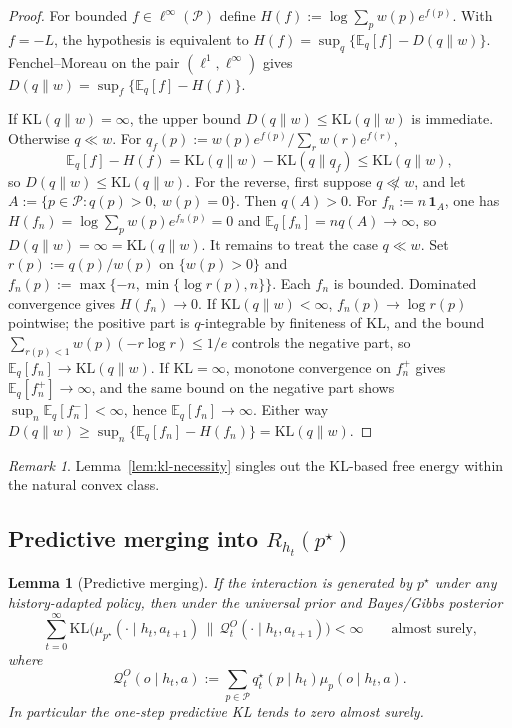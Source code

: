 \documentclass[11pt]{article}
\newtheorem{lemma}[theorem]{Lemma}
\theoremstyle{definition}
\theoremstyle{remark}
\newtheorem{remark}[theorem]{Remark}
\newcommand{\Pcal}{\mathcal{P}}
\newcommand{\Qcal}{\mathcal{Q}}
\newcommand{\E}{\mathbb{E}}
\newcommand{\KL}{\mathrm{KL}}
\newcommand{\one}{\mathbf{1}}
\begin{document}
\begin{proof}
For bounded $f\in\ell^\infty(\Pcal)$ define $H(f):=\log\sum_p w(p)e^{f(p)}$. With $f=-L$, the hypothesis is equivalent to $H(f)=\sup_q\{\E_q[f]-D(q\|w)\}$. Fenchel--Moreau on the pair $(\ell^1,\ell^\infty)$ gives $D(q\|w)=\sup_f\{\E_q[f]-H(f)\}$.

If $\KL(q\|w)=\infty$, the upper bound $D(q\|w)\le \KL(q\|w)$ is immediate. Otherwise $q\ll w$. For $q_f(p):=w(p)e^{f(p)}/\sum_r w(r)e^{f(r)}$,
\[
\E_q[f]-H(f)=\KL(q\|w)-\KL(q\|q_f)\le \KL(q\|w),
\]
so $D(q\|w)\le\KL(q\|w)$. For the reverse, first suppose $q\not\ll w$, and let $A:=\{p\in\Pcal:q(p)>0,\ w(p)=0\}$. Then $q(A)>0$. For $f_n:=n\,\one_A$, one has $H(f_n)=\log\sum_p w(p)e^{f_n(p)}=0$ and $\E_q[f_n]=nq(A)\to\infty$, so $D(q\|w)=\infty=\KL(q\|w)$. It remains to treat the case $q\ll w$. Set $r(p):=q(p)/w(p)$ on $\{w(p)>0\}$ and $f_n(p):=\max\{-n,\min\{\log r(p),n\}\}$. Each $f_n$ is bounded. Dominated convergence gives $H(f_n)\to 0$. If $\KL(q\|w)<\infty$, $f_n(p)\to\log r(p)$ pointwise; the positive part is $q$-integrable by finiteness of $\KL$, and the bound $\sum_{r(p)<1}w(p)(-r\log r)\le 1/e$ controls the negative part, so $\E_q[f_n]\to\KL(q\|w)$. If $\KL=\infty$, monotone convergence on $f_n^+$ gives $\E_q[f_n^+]\to\infty$, and the same bound on the negative part shows $\sup_n\E_q[f_n^-]<\infty$, hence $\E_q[f_n]\to\infty$. Either way $D(q\|w)\ge\sup_n\{\E_q[f_n]-H(f_n)\}=\KL(q\|w)$.
\end{proof}

\begin{remark}
Lemma~\ref{lem:kl-necessity} singles out the KL-based free energy within the natural convex class.
\end{remark}

\subsection{Predictive merging into $R_{h_t}(p^\star)$}

\begin{lemma}[Predictive merging]
\label{lem:merging}
If the interaction is generated by $p^\star$ under any history-adapted policy, then under the universal prior and Bayes/Gibbs posterior
\[
\sum_{t=0}^{\infty}
\KL\!\bigl(\mu_{p^\star}(\cdot\mid h_t,a_{t+1})\,\|\,\Qcal_t^O(\cdot\mid h_t,a_{t+1})\bigr)
<\infty
\qquad
\text{almost surely,}
\]
where
\[
\Qcal_t^O(o\mid h_t,a):=\sum_{p\in\Pcal} q_t^\star(p\mid h_t)\mu_p(o\mid h_t,a).
\]
In particular the one-step predictive KL tends to zero almost surely.
\end{lemma}
\end{document}
